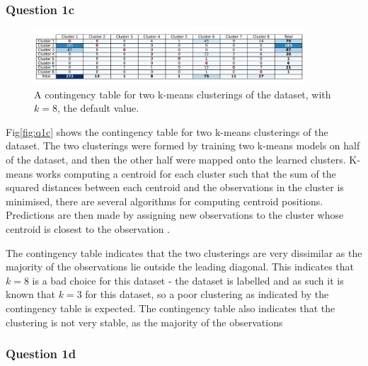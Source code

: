 \subsubsection{Question 1c}\label{subsubsec:q1c}
    \begin{figure}[htb]
    \centering
    \includegraphics[width=0.9\textwidth]{./figures/q1c}
    \caption{A contingency table for two k-means clusterings of the  dataset, with $k=8$,
        the default  value.}
    \label{fig:q1c}
    \end{figure}

    Fig\eqref{fig:q1c} shows the contingency table for two k-means clusterings of the dataset.
    The two clusterings were formed by training two k-means models on half of the dataset, and then the other half were
    mapped onto the learned clusters.
    K-means works computing a centroid for each cluster such that the sum of the squared distances between each centroid
    and the observations in the cluster is minimised, there are several algorithms for computing centroid positions.
    Predictions are then made by assigning new observations to the cluster whose centroid is closest to the
    observation \cite{sklearn-k-means}.

    The contingency table indicates that the two clusterings are very dissimilar as the majority of the observations
    lie outside the leading diagonal.
    This indicates that $k=8$ is a bad choice for this dataset - the dataset is labelled and as such it is known
    that $k=3$ for this dataset, so a poor clustering as indicated by the contingency table is expected.
    The contingency table also indicates that the clustering is not very stable, as the majority of the observations

\subsubsection{Question 1d}\label{subsubsec:q1d}
